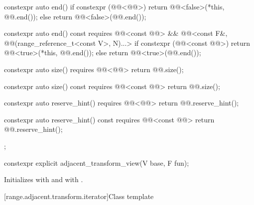 \begin{codeblock}
{{    constexpr auto end() {
      if constexpr (@@<@@>) {
        return @@<false>(*this, @@.end());
      } else {
        return @@<false>(@@.end());
      }
    }

    constexpr auto end() const
      requires @@<const @@> &&
               @@<const F&, @@(range_reference_t<const V>, N)...> {
      if constexpr (@@<const @@>) {
        return @@<true>(*this, @@.end());
      } else {
        return @@<true>(@@.end());
      }
    }

    constexpr auto size() requires @@<@@> {
      return @@.size();
    }

    constexpr auto size() const requires @@<const @@> {
      return @@.size();
    }

    constexpr auto reserve_hint() requires @@<@@> {
      return @@.reserve_hint();
    }

    constexpr auto reserve_hint() const requires @@<const @@> {
      return @@.reserve_hint();
    }
  };
}
\end{codeblock}

%
\begin{itemdecl}
constexpr explicit adjacent_transform_view(V base, F fun);
\end{itemdecl}

\begin{itemdescr}
\pnum
\effects
Initializes  with  and
 with .
\end{itemdescr}

[range.adjacent.transform.iterator]{Class template }

